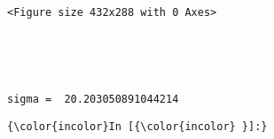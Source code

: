 \documentclass[11pt]{article}
\begin{document}
    
    \begin{center}
    \end{center}
    { \hspace*{\fill} \\}
    
    \begin{center}
    \end{center}
    { \hspace*{\fill} \\}
    
    
    \begin{verbatim}
<Figure size 432x288 with 0 Axes>
    \end{verbatim}

    
    \begin{center}
    \end{center}
    { \hspace*{\fill} \\}
    
    \begin{center}
    \end{center}
    { \hspace*{\fill} \\}
    
    \begin{Verbatim}[commandchars=\\\{\}]
sigma =  20.203050891044214

    \end{Verbatim}

    \begin{Verbatim}[commandchars=\\\{\}]
{\color{incolor}In [{\color{incolor} }]:} 
\end{Verbatim}



    
    
    
    
\end{document}
